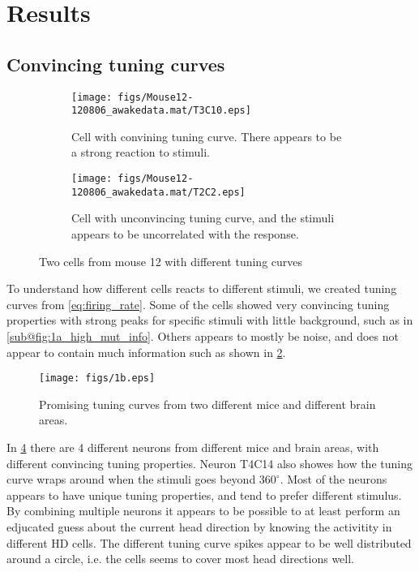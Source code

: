 \section{Results}

\subsection{Convincing tuning curves}
\begin{figure}[H]
    \centering
    \begin{subfigure}[b]{0.4\textwidth}
        \texttt{[image: figs/Mouse12-120806\_awakedata.mat/T3C10.eps]}
        \caption{Cell with convining tuning curve. There appears to be a strong reaction to stimuli.}
        \label{fig:1a_high_mut_info}
    \end{subfigure}
    \begin{subfigure}[b]{0.4\textwidth}
        \texttt{[image: figs/Mouse12-120806\_awakedata.mat/T2C2.eps]}
        \caption{Cell with unconvincing tuning curve, and the stimuli appears to be uncorrelated with the response.}
        \label{fig:1a_low_mut_info}
    \end{subfigure}
    \caption{Two cells from mouse 12 with different tuning curves}
    \label{fig:1a_two_tuning_curves}
\end{figure}
To understand how different cells reacts to different stimuli, we created tuning curves from \cref{eq:firing_rate}. Some of the cells showed very convincing tuning properties with strong peaks for specific stimuli with little background, such as in \cref{sub@fig:1a_high_mut_info}. Others appears to mostly be noise, and does not appear to contain much information such as shown in \cref{fig:1a_low_mut_info}. 
\begin{figure}[H]
    \centering
    \texttt{[image: figs/1b.eps]}
    \caption{Promising tuning curves from two different mice and different brain areas. }
    \label{fig:1b_convincing_tuning}
\end{figure} 
In \cref{fig:1b_convincing_tuning} there are 4 different neurons from different mice and brain areas, with different convincing tuning properties. Neuron T4C14 also showes how the tuning curve wraps around when the stimuli goes beyond $360^\circ$. Most of the neurons appears to have unique tuning properties, and tend to prefer different stimulus. By combining multiple neurons it appears to be possible to at least perform an edjucated guess about the current head direction by knowing the activitity in different HD cells. The different tuning curve spikes appear to be well distributed around a circle, i.e. the cells seems to cover most head directions well. 
